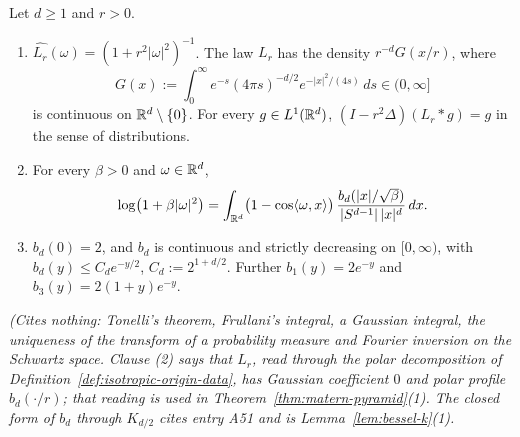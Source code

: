 \begin{lemma}
\label{lem:bessel-profile}
\leanok
{}
Let $d \ge 1$ and $r > 0$.
\begin{enumerate}
\item $\widehat{L_r}(\omega) = (1 + r^2|\omega|^2)^{-1}$. The law $L_r$ has the density
$r^{-d}G(x/r)$, where
\[
  G(x) := \int_0^\infty e^{-s}(4\pi s)^{-d/2}e^{-|x|^2/(4s)}\,ds \in (0, \infty]
\]
is continuous on $\mathbb{R}^d \setminus \{0\}$. For every $g \in L^1(\mathbb{R}^d)$,
$(I - r^2\Delta)(L_r * g) = g$ in the sense of distributions.
\item For every $\beta > 0$ and $\omega \in \mathbb{R}^d$,
\[
  \log\bigl(1 + \beta|\omega|^2\bigr)
   = \int_{\mathbb{R}^d}\bigl(1 - \cos\langle\omega, x\rangle\bigr)\,
     \frac{b_d(|x|/\sqrt\beta)}{|S^{d-1}|\,|x|^d}\,dx .
\]
\item $b_d(0) = 2$, and $b_d$ is continuous and strictly decreasing on $[0, \infty)$, with
$b_d(y) \le C_de^{-y/2}$, $C_d := 2^{1+d/2}$. Further $b_1(y) = 2e^{-y}$ and
$b_3(y) = 2(1 + y)e^{-y}$.
\end{enumerate}
\statusT\quad\emph{(Cites nothing: Tonelli's theorem, Frullani's integral, a Gaussian integral,
the uniqueness of the transform of a probability measure and Fourier inversion on the Schwartz
space. Clause (2) says that $L_r$,
read through the polar decomposition of Definition~\ref{def:isotropic-origin-data}, has Gaussian coefficient
$0$ and polar profile $b_d(\cdot/r)$; that reading is used in Theorem~\ref{thm:matern-pyramid}(1).
The closed form of $b_d$ through $K_{d/2}$ cites entry A51 and is Lemma~\ref{lem:bessel-k}(1).
}
\end{lemma}
